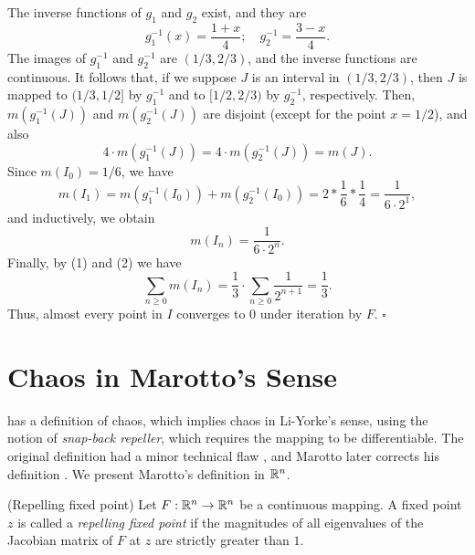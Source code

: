 \documentclass[10pt,draft,twoside]{book}
\begin{document}
\begin{example}
The inverse functions of $g_1$ and $g_2$ exist, and they are
\begin{equation*}
  g_1^{-1}(x) = \frac{1+x}{4}; \quad g_2^{-1} = \frac{3-x}{4}.
\end{equation*}
The images of $g_1^{-1}$ and $g_2^{-1}$ are $(1/3,2/3)$, and the inverse functions are continuous.
It follows that, if we suppose $J$ is an interval in $(1/3,2/3)$, then $J$ is mapped to $(1/3,1/2]$ by $g_1^{-1}$ and to $[1/2,2/3)$ by $g_2^{-1}$, respectively.
Then, $m(g_1^{-1}(J))$ and $m(g_2^{-1}(J))$ are disjoint (except for the point $x = 1/2$), and also
\begin{equation*}
  4 \cdot m(g_1^{-1}(J)) = 4 \cdot m(g_2^{-1}(J)) = m(J).
\end{equation*}
Since $m(I_0) = 1/6$, we have
\begin{equation*}
  m(I_1) 
  = m(g_1^{-1}(I_0)) + m(g_2^{-1}(I_0))
  = 2 * \frac{1}{6} * \frac{1}{4}
  = \frac{1}{6\cdot 2^1},
\end{equation*}
and inductively, we obtain
\begin{equation*}
  m(I_n) = \frac{1}{6 \cdot 2^n}.
\end{equation*}
%
Finally, by (1) and (2) we have
\begin{equation*}
  \sum\limits_{n\geq 0} m(I_n)
  = \frac{1}{3} \cdot \sum\limits_{n\geq 0} \frac{1}{2^{n+1}}
  = \frac{1}{3}.
\end{equation*}
Thus, almost every point in $I$ converges to 0 under iteration by $F$.
$\square$
\label{eg:liyorke-null}
\end{example}


\section{Chaos in Marotto's Sense}
\citet{marotto1} has a definition of chaos, which implies chaos in Li-Yorke's sense, using the notion of \textit{snap-back repeller}, which requires the mapping to be differentiable.
The original definition had a minor technical flaw \citep{shi}, and Marotto later corrects his definition \citep{marotto2}.
We present Marotto's definition in $\mathbb{R}^n$.
\begin{definition}
  (Repelling fixed point)
  Let $F: \mathbb{R}^n \to \mathbb{R}^n$ be a continuous mapping. 
  A fixed point $z$ is called a \textit{repelling fixed point} if the magnitudes of all eigenvalues of the Jacobian matrix of $F$ at $z$ are strictly greater than $1$.
\end{definition}
\end{document}
